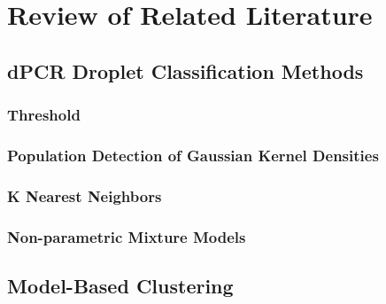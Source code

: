 \chapter{Review of Related Literature}
\label{sec:rrl} 

\section{dPCR Droplet Classification Methods}
\label{sec:dpcrclassifiers}

\subsection{Threshold}
\label{sec:threshold}
\subsection{Population Detection of Gaussian Kernel Densities}
\label{sec:peakdetectionkde}
\subsection{K Nearest Neighbors}
\label{sec:knn}
\subsection{Non-parametric Mixture Models}
\label{sec:nonparametricmixmodels}

\section{Model-Based Clustering}
\label{sec:modelbasedclustering}

